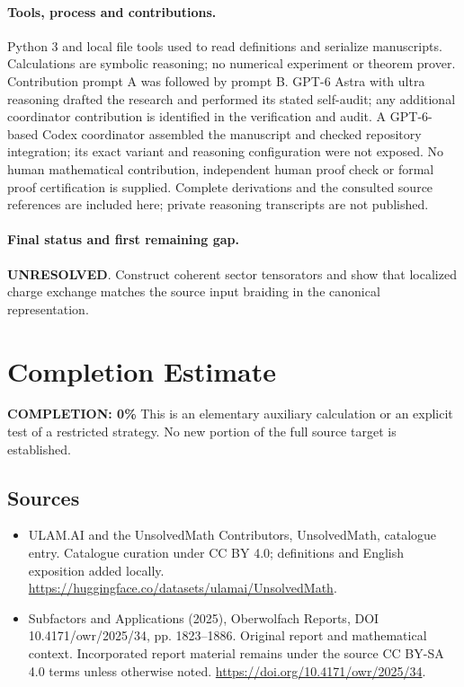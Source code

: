 \documentclass[11pt]{article}
\begin{document}
\paragraph{Tools, process and contributions.}
Python 3 and local file tools used to read definitions and serialize manuscripts. Calculations are symbolic reasoning; no numerical experiment or theorem prover. Contribution prompt A was followed by prompt B. GPT-6 Astra with ultra reasoning drafted the research and performed its stated self-audit; any additional coordinator contribution is identified in the verification and audit. A GPT-6-based Codex coordinator assembled the manuscript and checked repository integration; its exact variant and reasoning configuration were not exposed. No human mathematical contribution, independent human proof check or formal proof certification is supplied. Complete derivations and the consulted source references are included here; private reasoning transcripts are not published.

\paragraph{Final status and first remaining gap.}
\textbf{UNRESOLVED}. Construct coherent sector tensorators and show that localized charge exchange matches the source input braiding in the canonical representation.

\section{Completion Estimate}
\noindent\textbf{COMPLETION: 0\%}
This is an elementary auxiliary calculation or an explicit test of a restricted strategy. No new portion of the full source target is established.

\subsection{Sources}
\begin{itemize}
\item[\hypertarget{source:statement:1}{S1}] ULAM.AI and the UnsolvedMath Contributors, UnsolvedMath, catalogue entry. Catalogue curation under CC BY 4.0; definitions and English exposition added locally.
\url{https://huggingface.co/datasets/ulamai/UnsolvedMath}.
\item[\hypertarget{source:statement:2}{S2}] Subfactors and Applications (2025), Oberwolfach Reports, DOI 10.4171/owr/2025/34, pp. 1823--1886. Original report and mathematical context. Incorporated report material remains under the source CC BY-SA 4.0 terms unless otherwise noted.
\url{https://doi.org/10.4171/owr/2025/34}.
\end{itemize}
\label{end:statement}
\end{document}
